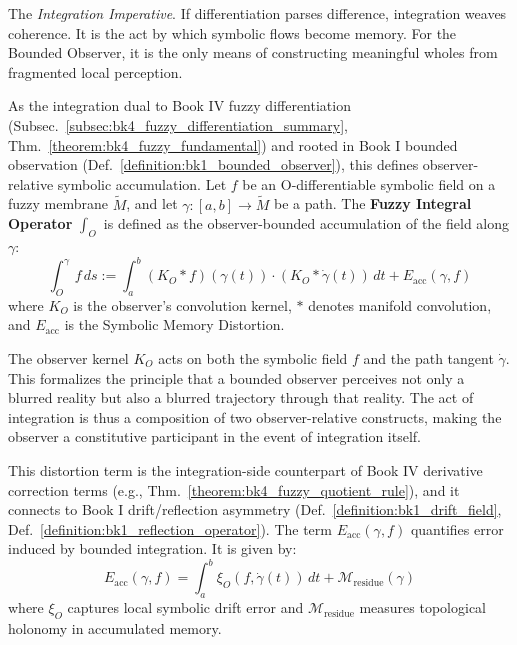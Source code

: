 The \emph{Integration Imperative}. If differentiation parses difference, integration weaves coherence. It is the act by which symbolic flows become memory. For the Bounded Observer, it is the only means of constructing meaningful wholes from fragmented local perception.

\begin{definition}
\label{definition:bk4_fuzzy_integral_operator}
As the integration dual to Book IV fuzzy differentiation (Subsec.~\ref{subsec:bk4_fuzzy_differentiation_summary}, Thm.~\ref{theorem:bk4_fuzzy_fundamental}) and rooted in Book I bounded observation (Def.~\ref{definition:bk1_bounded_observer}), this defines observer-relative symbolic accumulation.
Let $f$ be an O-differentiable symbolic field on a fuzzy membrane $\tilde{M}$, and let $\gamma: [a, b] \to \tilde{M}$ be a path. The \textbf{Fuzzy Integral Operator} $\int_O$ is defined as the observer-bounded accumulation of the field along $\gamma$:
\[
\int_O^\gamma f \, ds := \int_a^b (K_O * f)(\gamma(t)) \cdot (K_O * \dot{\gamma}(t)) \, dt + E_{\text{acc}}(\gamma, f)
\]
where $K_O$ is the observer's convolution kernel, $*$ denotes manifold convolution, and $E_{\text{acc}}$ is the Symbolic Memory Distortion.
\end{definition}

\begin{remark}
    The observer kernel $K_O$ acts on both the symbolic field $f$ and the path tangent $\dot{\gamma}$. This formalizes the principle that a bounded observer perceives not only a blurred reality but also a blurred trajectory through that reality. The act of integration is thus a composition of two observer-relative constructs, making the observer a constitutive participant in the event of integration itself.
\end{remark}

\begin{definition}
\label{definition:bk4_symbolic_memory_distortion}
This distortion term is the integration-side counterpart of Book IV derivative correction terms (e.g., Thm.~\ref{theorem:bk4_fuzzy_quotient_rule}), and it connects to Book I drift/reflection asymmetry (Def.~\ref{definition:bk1_drift_field}, Def.~\ref{definition:bk1_reflection_operator}).
The term $E_{\text{acc}}(\gamma, f)$ quantifies error induced by bounded integration. It is given by:
\[
E_{\text{acc}}(\gamma, f) = \int_a^b \xi_O(f, \dot{\gamma}(t)) \, dt + \mathcal{M}_{\text{residue}}(\gamma)
\]
where $\xi_O$ captures local symbolic drift error and $\mathcal{M}_{\text{residue}}$ measures topological holonomy in accumulated memory.
\end{definition}

